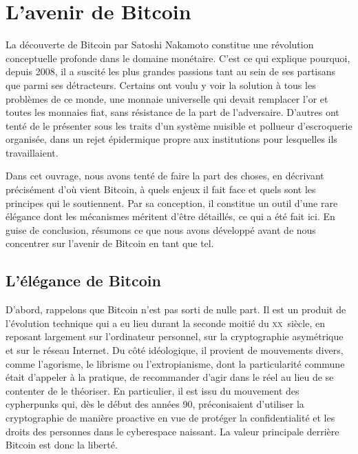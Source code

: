 
\chapter{L'avenir de Bitcoin} %
\label{ch:15}


La découverte de Bitcoin par Satoshi Nakamoto constitue une révolution conceptuelle profonde dans le domaine monétaire. C'est ce qui explique pourquoi, depuis 2008, il a suscité les plus grandes passions tant au sein de ses partisans que parmi ses détracteurs. Certains ont voulu y voir la solution à tous les problèmes de ce monde, une monnaie universelle qui devait remplacer l'or et toutes les monnaies fiat, sans résistance de la part de l'adversaire. D'autres ont tenté de le présenter sous les traits d'un système nuisible et pollueur d'escroquerie organisée, dans un rejet épidermique propre aux institutions pour lesquelles ils travaillaient.

Dans cet ouvrage, nous avons tenté de faire la part des choses, en décrivant précisément d'où vient Bitcoin, à quels enjeux il fait face et quels sont les principes qui le soutiennent. Par sa conception, il constitue un outil d'une rare élégance dont les mécanismes méritent d'être détaillés, ce qui a été fait ici. En guise de conclusion, résumons ce que nous avons développé avant de nous concentrer sur l'avenir de Bitcoin en tant que tel. %

\section*{L'élégance de Bitcoin}


D'abord, rappelons que Bitcoin n'est pas sorti de nulle part. Il est un produit de l'évolution technique qui a eu lieu durant la seconde moitié du \textsc{xx}\ieme{}~siècle, en reposant largement sur l'ordinateur personnel, sur la cryptographie asymétrique et sur le réseau Internet. Du côté idéologique, il provient de mouvements divers, comme l'agorisme, le librisme ou l'extropianisme, dont la particularité commune était d'appeler à la pratique, de recommander d'agir dans le réel au lieu de se contenter de le théoriser. En particulier, il est issu du mouvement des cypherpunks qui, dès le début des années 90, préconisaient d'utiliser la cryptographie de manière proactive en vue de protéger la confidentialité et les droits des personnes dans le cyberespace naissant. La valeur principale derrière Bitcoin est donc la liberté.


